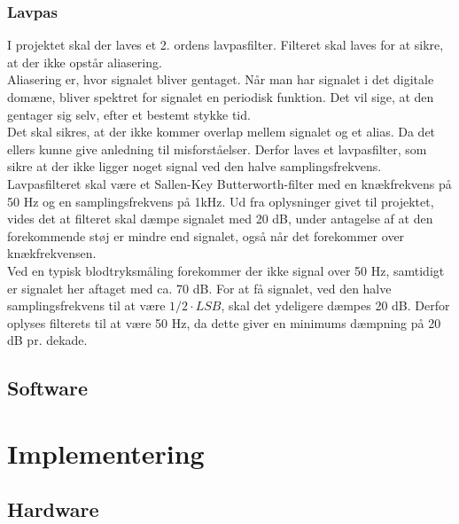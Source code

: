 \subsubsection{Lavpas}
I projektet skal der laves et 2. ordens lavpasfilter. Filteret skal laves for at sikre, at der ikke opstår aliasering.\\
Aliasering \cite{DSB} er, hvor signalet bliver gentaget. Når man har signalet i det digitale domæne, bliver spektret for signalet en periodisk funktion. Det vil sige, at den gentager sig selv, efter et bestemt stykke tid. \\
Det skal sikres, at der ikke kommer overlap mellem signalet og et alias. Da det ellers kunne give anledning til misforståelser. Derfor laves et lavpasfilter, som sikre at der ikke ligger noget signal ved den halve samplingsfrekvens.    
\newline  
Lavpasfilteret skal være et Sallen-Key Butterworth-filter med en knækfrekvens på 50 Hz og en samplingsfrekvens på 1kHz. Ud fra oplysninger givet til projektet, vides det at filteret skal dæmpe signalet med 20 dB, under antagelse af at den forekommende støj er mindre end signalet, også når det  forekommer over knækfrekvensen.\\
Ved en typisk blodtryksmåling forekommer der ikke signal over 50 Hz, samtidigt er signalet her aftaget med ca. 70 dB. For at få signalet, ved den halve samplingsfrekvens til at være $ 1/2 \cdot LSB $, skal det ydeligere dæmpes 20 dB. Derfor oplyses filterets til at være 50 Hz, da dette giver en minimums dæmpning på 20 dB pr. dekade.
\subsection{Software}

\section{Implementering}
\subsection{Hardware}
